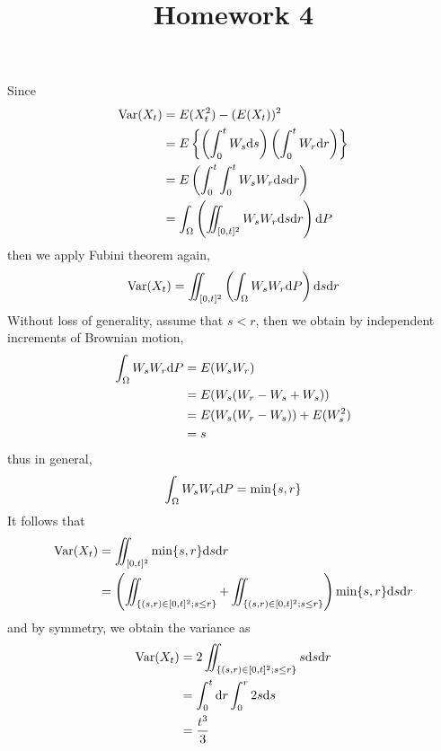 \documentclass{homework}
\title{Homework 4}
\DeclareMathOperator{\var}{Var}
\begin{document}
    \maketitle

    \problem
    Since
    \[\begin{aligned}
        \var(X_t)&=E(X_t^2)-(E(X_t))^2\\
        &=E\left\{\left(\int_0^tW_s\diff s\right)
        \left(\int_0^tW_r\diff r\right)\right\}\\
        &=E\left(\int_0^t\int_0^tW_sW_r\diff s\diff r\right)\\
        &=\int_\Omega\left(\iint_{[0,t]^2}W_sW_r\diff s\diff r\right)\diff P
    \end{aligned}\]
    then we apply Fubini theorem again,
    \[\var(X_t)=\iint_{[0,t]^2}
    \left(\int_\Omega W_sW_r\diff P\right)\diff s\diff r\]
    Without loss of generality, assume that $s<r$, then we obtain
    by independent increments of Brownian motion,
    \[\begin{aligned}
        \int_\Omega W_sW_r\mathrm d P&=E(W_sW_r)\\
        &=E(W_s(W_r-W_s+W_s))\\
        &=E(W_s(W_r-W_s))+E(W_s^2)\\
        &=s
    \end{aligned}\]
    thus in general,
    \[\int_\Omega W_sW_r\mathrm d P=\min\{s,r\}\]
    It follows that
    \[\begin{aligned}
        \var(X_t)&=\iint_{[0,t]^2}\min\{s,r\}\diff s\diff r\\
        &=\left(\iint_{\{(s,r)\in[0,t]^2;s\leq r\}}
                +\iint_{\{(s,r)\in[0,t]^2;s\leq r\}}\right)
        \min\{s,r\}\diff s\diff r\\
    \end{aligned}\]
    and by symmetry, we obtain the variance as
    \[\begin{aligned}
        \var(X_t)&=2\iint_{\{(s,r)\in[0,t]^2;s\leq r\}}s\diff s\diff r\\
        &=\int_0^t\diff r\int_0^r2s\diff s\\
        &=\frac{t^3}{3}
    \end{aligned}\]
\end{document}
